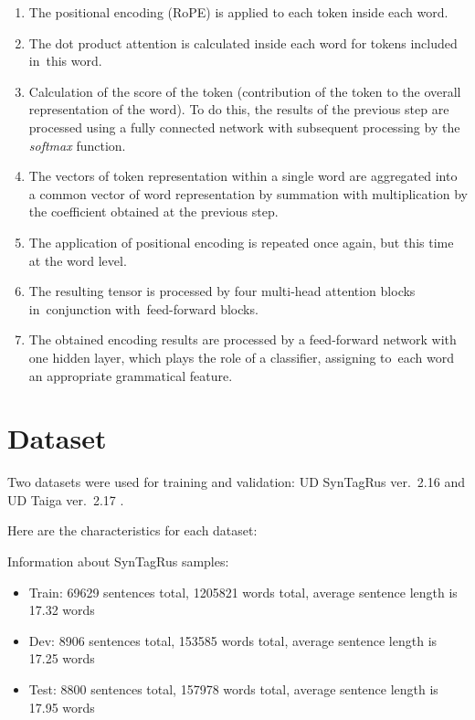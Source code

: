 \documentclass[11pt,twocolumn]{article}
\begin{document}
\begin{enumerate}
\item{
The positional encoding (RoPE) is applied to each token inside each word.
}
\item{
The dot product attention is calculated inside each word for tokens included in~this word.
}
\item{
Calculation of the score of the token (contribution of the token to the overall representation of the word). To do this, the results of the previous step are processed using a fully connected network with subsequent processing by the \textit{softmax} function.
}
\item{
The vectors of token representation within a single word are aggregated into a common vector of word representation by summation with multiplication by the coefficient obtained at the previous step.
}
\item{
The application of positional encoding is repeated once again, but this time at the word level.
}
\item{
The resulting tensor is processed by four multi-head attention blocks in~conjunction with~feed-forward blocks.
}
\item{
The obtained encoding results are processed by a feed-forward network with ~ one hidden layer, which plays the role of a classifier, assigning to~each word an appropriate grammatical feature.
}
\end{enumerate}

\section{Dataset}

  Two datasets were used for training and validation:
  UD SynTagRus ver.~2.16 \cite{Sintagrus} and
  UD Taiga ver.~2.17 \cite{Taiga}.

  Here are the characteristics for each dataset:

  Information about   SynTagRus samples:
  
  \begin{itemize}
 \item { 
Train:
69629 sentences  total,
1205821 words total,
average sentence length is  17.32 words
}
\item {
Dev:
 8906 sentences total,
153585 words total,
average sentence length is  17.25 words
}
\item {
Test:
 8800 sentences total,
157978 words total,
average sentence length is  17.95 words
}
\end{itemize}
\end{document}
